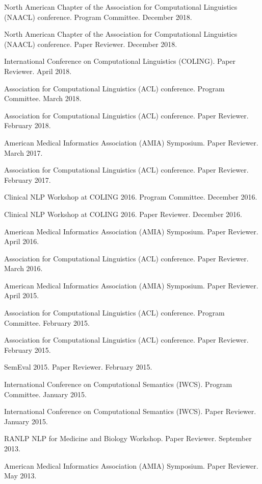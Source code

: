 \documentclass[letterpaper]{article}
\renewenvironment{itemize}{
  \begin{list}{}{
    \setlength{\leftmargin}{1.5em}
  }
}{
  \end{list}
}
\begin{document}
\begin{itemize}
\item North American Chapter of the Association for Computational Linguistics (NAACL) conference. Program Committee. December 2018.
\item North American Chapter of the Association for Computational Linguistics (NAACL) conference. Paper Reviewer. December 2018.
\item International Conference on Computational Linguistics (COLING). Paper Reviewer. April 2018.
\item Association for Computational Linguistics (ACL) conference. Program Committee. March 2018.
\item Association for Computational Linguistics (ACL) conference. Paper Reviewer. February 2018.
\item American Medical Informatics Association (AMIA) Symposium. Paper Reviewer. March 2017.
\item Association for Computational Linguistics (ACL) conference. Paper Reviewer. February 2017.
\item Clinical NLP Workshop at COLING 2016. Program Committee. December 2016.
\item Clinical NLP Workshop at COLING 2016. Paper Reviewer. December 2016.
\item American Medical Informatics Association (AMIA) Symposium. Paper Reviewer. April 2016.
\item Association for Computational Linguistics (ACL) conference. Paper Reviewer. March 2016.
\item American Medical Informatics Association (AMIA) Symposium. Paper Reviewer. April 2015.
\item Association for Computational Linguistics (ACL) conference. Program Committee. February 2015.
\item Association for Computational Linguistics (ACL) conference. Paper Reviewer. February 2015.
\item SemEval 2015. Paper Reviewer. February 2015.
\item International Conference on Computational Semantics (IWCS). Program Committee. January 2015.
\item International Conference on Computational Semantics (IWCS). Paper Reviewer. January 2015.
\item RANLP NLP for Medicine and Biology Workshop. Paper Reviewer. September 2013.
\item American Medical Informatics Association (AMIA) Symposium. Paper Reviewer. May 2013.

\end{itemize}
\end{document}
